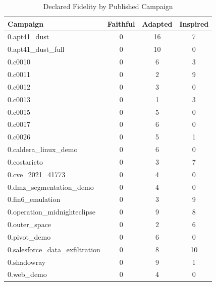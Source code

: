 \begin{table}[htbp]
\centering
\caption{Declared Fidelity by Published Campaign}
\label{tab:fidelity}
\begin{tabular}{lccc}
\toprule
Campaign & Faithful & Adapted & Inspired \\
\midrule
0.apt41_dust & 0 & 16 & 7 \\
0.apt41_dust_full & 0 & 10 & 0 \\
0.c0010 & 0 & 6 & 3 \\
0.c0011 & 0 & 2 & 9 \\
0.c0012 & 0 & 3 & 0 \\
0.c0013 & 0 & 1 & 3 \\
0.c0015 & 0 & 5 & 0 \\
0.c0017 & 0 & 6 & 0 \\
0.c0026 & 0 & 5 & 1 \\
0.caldera_linux_demo & 0 & 6 & 0 \\
0.costaricto & 0 & 3 & 7 \\
0.cve_2021_41773 & 0 & 4 & 0 \\
0.dmz_segmentation_demo & 0 & 4 & 0 \\
0.fin6_emulation & 0 & 3 & 9 \\
0.operation_midnighteclipse & 0 & 9 & 8 \\
0.outer_space & 0 & 2 & 6 \\
0.pivot_demo & 0 & 6 & 0 \\
0.salesforce_data_exfiltration & 0 & 8 & 10 \\
0.shadowray & 0 & 9 & 1 \\
0.web_demo & 0 & 4 & 0 \\
\bottomrule
\end{tabular}
\end{table}
